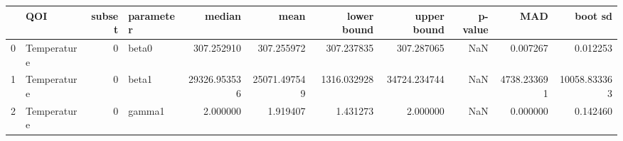 \begin{tabular}{llrlrrrrrrr}
\toprule
 & QOI & subset & parameter & median & mean & lower bound & upper bound & p-value & MAD & boot sd \\
\midrule
0 & Temperature & 0 & beta0 & 307.252910 & 307.255972 & 307.237835 & 307.287065 & NaN & 0.007267 & 0.012253 \\
1 & Temperature & 0 & beta1 & 29326.953536 & 25071.497549 & 1316.032928 & 34724.234744 & NaN & 4738.233691 & 10058.833363 \\
2 & Temperature & 0 & gamma1 & 2.000000 & 1.919407 & 1.431273 & 2.000000 & NaN & 0.000000 & 0.142460 \\
\bottomrule
\end{tabular}
